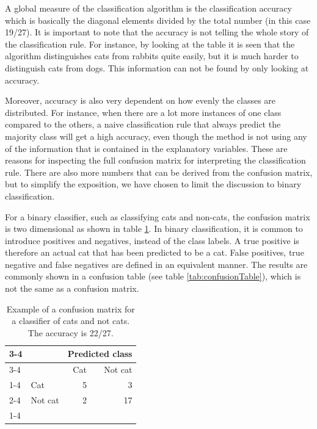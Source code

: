 A global measure of the classification algorithm is the classification accuracy which is basically the diagonal elements divided by the total number (in this case 19/27).  It is important to note that the accuracy is not telling the whole story of the classification rule.  For instance, by looking at the table it is seen that the algorithm distinguishes cats from rabbits quite easily, but it is much harder to distinguish cats from dogs.  This information can not be found by only looking at accuracy.  

Moreover, accuracy is also very dependent on how evenly the classes are distributed.   For instance, when there are a lot more instances of one class compared to the others, a naive classification rule that always predict the majority class will get a high accuracy, even though the method is not using any of the information that is contained in the explanatory variables.  These are reasons for inspecting the full confusion matrix for interpreting the classification rule.  There are also more numbers that can be derived from the confusion matrix, but to simplify the exposition, we have chosen to limit the discussion to binary classification.  

For a binary classifier, such as classifying cats and non-cats, the confusion matrix is two dimensional as shown in table \ref{tab:binary}.  In binary classification, it is common to introduce positives and negatives, instead of the class labels.  A true positive is therefore an actual cat that has been predicted to be a cat.  False positives, true negative and false negatives are defined in an equivalent manner.  The results are commonly shown in a confusion table (see table \ref{tab:confusionTable}), which is not the same as a confusion matrix.  

\vspace{1ex}
\begin{table}
\centering
\begin{tabular}{ll|r|r|}
\cline{3-4}
&&  \multicolumn{2}{c|}{Predicted class}\\
\cline{3-4}
&& Cat & Not cat\\ 
\cline{1-4}
\multicolumn{1}{ |c| }{\multirow{3}{*}{Actual class} }
& Cat & 5 & 3\\
\cline{2-4}
\multicolumn{1}{ |c| }{} & Not cat & 2 & 17 \\
\cline{1-4}
\end{tabular}
\caption{Example of a confusion matrix for a classifier of cats and not cats. The accuracy is 22/27.}
\label{tab:binary}
\end{table}
\vspace{1ex}


